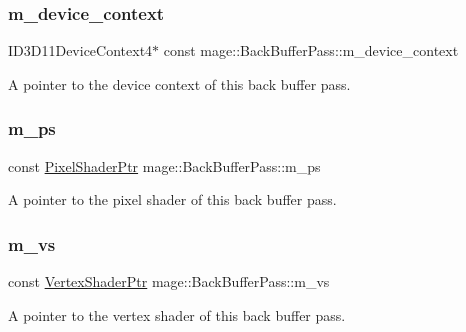 \subsubsection{\texorpdfstring{m\+\_\+device\+\_\+context}{m\_device\_context}}
{\footnotesize\ttfamily I\+D3\+D11\+Device\+Context4$\ast$ const mage\+::\+Back\+Buffer\+Pass\+::m\+\_\+device\+\_\+context\hspace{0.3cm}{\ttfamily [private]}}

A pointer to the device context of this back buffer pass. \hypertarget{classmage_1_1_back_buffer_pass_a4fdc3c01db3a46a63b173d08fd0972d7}{}\label{classmage_1_1_back_buffer_pass_a4fdc3c01db3a46a63b173d08fd0972d7} 
\subsubsection{\texorpdfstring{m\+\_\+ps}{m\_ps}}
{\footnotesize\ttfamily const \hyperlink{namespacemage_acbec875bb5e5e085e32ed244a24d2b6f}{Pixel\+Shader\+Ptr} mage\+::\+Back\+Buffer\+Pass\+::m\+\_\+ps\hspace{0.3cm}{\ttfamily [private]}}

A pointer to the pixel shader of this back buffer pass. \hypertarget{classmage_1_1_back_buffer_pass_a1ad5c084edf77f7462336fd48e45c5c7}{}\label{classmage_1_1_back_buffer_pass_a1ad5c084edf77f7462336fd48e45c5c7} 
\subsubsection{\texorpdfstring{m\+\_\+vs}{m\_vs}}
{\footnotesize\ttfamily const \hyperlink{namespacemage_a1f19b094f771e30bc0a6c1cebcc0dd58}{Vertex\+Shader\+Ptr} mage\+::\+Back\+Buffer\+Pass\+::m\+\_\+vs\hspace{0.3cm}{\ttfamily [private]}}

A pointer to the vertex shader of this back buffer pass. 